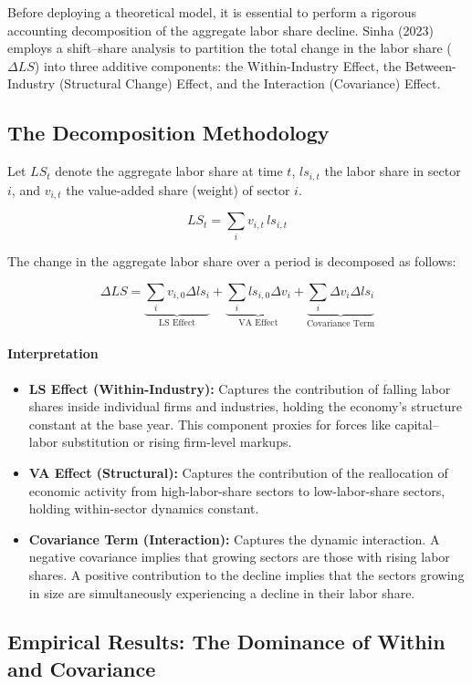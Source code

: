 \documentclass[12pt]{article}
\begin{document}
Before deploying a theoretical model, it is essential to perform a rigorous accounting decomposition of the aggregate labor share decline. Sinha (2023) employs a shift–share analysis to partition the total change in the labor share ($\Delta LS$) into three additive components: the Within-Industry Effect, the Between-Industry (Structural Change) Effect, and the Interaction (Covariance) Effect.

\subsection{The Decomposition Methodology}
Let $LS_t$ denote the aggregate labor share at time $t$, $ls_{i,t}$ the labor share in sector $i$, and $v_{i,t}$ the value-added share (weight) of sector $i$.

\[
LS_t = \sum_{i} v_{i,t} \, ls_{i,t}
\]

The change in the aggregate labor share over a period is decomposed as follows:

\[
\Delta LS = \underbrace{\sum_{i} v_{i,0} \Delta ls_{i}}_{\text{LS Effect}} +
\underbrace{\sum_{i} ls_{i,0} \Delta v_{i}}_{\text{VA Effect}} + \underbrace{\sum_{i} \Delta v_{i} \Delta ls_{i}}_{\text{Covariance Term}}
\]

\paragraph{Interpretation}
\begin{itemize}[leftmargin=*,itemsep=4pt]
\item \textbf{LS Effect (Within-Industry):} Captures the contribution of falling labor shares inside individual firms and industries, holding the economy’s structure constant at the base year. This component proxies for forces like capital–labor substitution or rising firm-level markups.
\item \textbf{VA Effect (Structural):} Captures the contribution of the reallocation of economic activity from high-labor-share sectors to low-labor-share sectors, holding within-sector dynamics constant.
\item \textbf{Covariance Term (Interaction):} Captures the dynamic interaction. A negative covariance implies that growing sectors are those with rising labor shares. A positive contribution to the decline implies that the sectors growing in size are simultaneously experiencing a decline in their labor share.
\end{itemize}

\subsection{Empirical Results: The Dominance of Within and Covariance}
\end{document}
